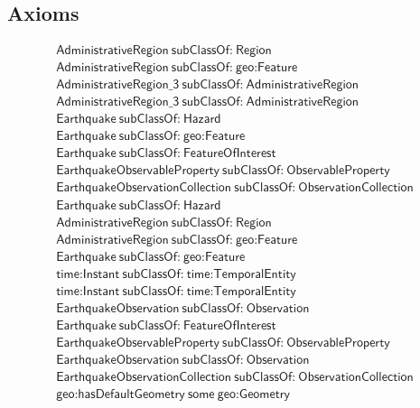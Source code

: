 \subsection{Axioms}
\begin{align}
  \textsf{AdministrativeRegion}~\textsf{subClassOf:}~\textsf{Region}\\
  \textsf{AdministrativeRegion}~\textsf{subClassOf:}~\textsf{geo:Feature}\\
  \textsf{AdministrativeRegion\_3}~\textsf{subClassOf:}~\textsf{AdministrativeRegion}\\
  \textsf{AdministrativeRegion\_3}~\textsf{subClassOf:}~\textsf{AdministrativeRegion}\\
  \textsf{Earthquake}~\textsf{subClassOf:}~\textsf{Hazard}\\
  \textsf{Earthquake}~\textsf{subClassOf:}~\textsf{geo:Feature}\\
  \textsf{Earthquake}~\textsf{subClassOf:}~\textsf{FeatureOfInterest}\\
  \textsf{EarthquakeObservableProperty}~\textsf{subClassOf:}~\textsf{ObservableProperty}\\
  \textsf{EarthquakeObservationCollection}~\textsf{subClassOf:}~\textsf{ObservationCollection}\\
  \textsf{Earthquake}~\textsf{subClassOf:}~\textsf{Hazard}\\
  \textsf{AdministrativeRegion}~\textsf{subClassOf:}~\textsf{Region}\\
  \textsf{AdministrativeRegion}~\textsf{subClassOf:}~\textsf{geo:Feature}\\
  \textsf{Earthquake}~\textsf{subClassOf:}~\textsf{geo:Feature}\\
  \textsf{time:Instant}~\textsf{subClassOf:}~\textsf{time:TemporalEntity}\\
  \textsf{time:Instant}~\textsf{subClassOf:}~\textsf{time:TemporalEntity}\\
  \textsf{EarthquakeObservation}~\textsf{subClassOf:}~\textsf{Observation}\\
  \textsf{Earthquake}~\textsf{subClassOf:}~\textsf{FeatureOfInterest}\\
  \textsf{EarthquakeObservableProperty}~\textsf{subClassOf:}~\textsf{ObservableProperty}\\
  \textsf{EarthquakeObservation}~\textsf{subClassOf:}~\textsf{Observation}\\
  \textsf{EarthquakeObservationCollection}~\textsf{subClassOf:}~\textsf{ObservationCollection}\\
  \textsf{geo:hasDefaultGeometry}~\textsf{some}~\textsf{geo:Geometry}\\

\end{align}

